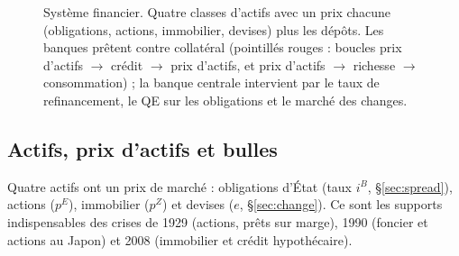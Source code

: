 \documentclass[11pt,a4paper]{article}
\begin{document}
\begin{figure}[htbp]
{}
\caption{Système financier. Quatre classes d'actifs avec un prix chacune (obligations, actions, immobilier, devises) plus les dépôts. Les banques prêtent contre collatéral (pointillés rouges : boucles prix d'actifs $\to$ crédit $\to$ prix d'actifs, et prix d'actifs $\to$ richesse $\to$ consommation) ; la banque centrale intervient par le taux de refinancement, le QE sur les obligations et le marché des changes.}
\label{fig:fin}
\end{figure}

\subsection{Actifs, prix d'actifs et bulles}
\label{sec:actifs}
Quatre actifs ont un prix de marché : obligations d'État (taux $i^B$, \S\ref{sec:spread}), actions ($p^E$), immobilier ($p^Z$) et devises ($e$, \S\ref{sec:change}). Ce sont les supports indispensables des crises de 1929 (actions, prêts sur marge), 1990 (foncier et actions au Japon) et 2008 (immobilier et crédit hypothécaire).
\end{document}
